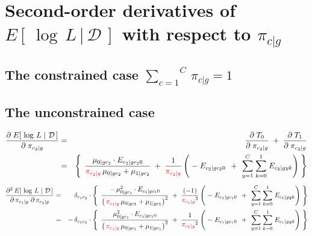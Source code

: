 

\section{Second-order derivatives of $E\!\left[\,\left.\log\,L\,\right\vert\,\mathcal{D}\,\right]$ with respect to $\pi_{c \vert g}$}
\setcounter{theorem}{0}
\setcounter{equation}{0}

\renewcommand{\theenumi}{\roman{enumi}}
\renewcommand{\labelenumi}{\textnormal{(\theenumi)}$\;\;$}

\subsection{The constrained case $\overset{C}{\underset{c=1}{\sum}}\,\pi_{c \vert g} = 1$}


\vskip 0.5cm
\subsection{The unconstrained case}
\begin{eqnarray*}
\dfrac{\partial\;E\!\left[\,\left.\log\,L\;\right\vert\,\mathcal{D}\,\right]}{\partial\;\pi_{c_{2} \vert g}}
&=& \dfrac{\partial\;T_{0}}{\partial\;\pi_{c_{2} \vert g}} \;+\; \dfrac{\partial\;T_{1}}{\partial\;\pi_{c_{2} \vert g}}
\\
&=&
	\left\{\;\,
		\dfrac{\mu_{0 \vert gc_{2}}\cdot E_{c_{2} \vert gc_{2}0}}{{\color{red}\pi_{c_{2} \vert g}}\,\mu_{0 \vert gc_{2}} + \mu_{1\vert gc_{2}}}
		\;+\;
		\dfrac{1}{{\color{red}\pi_{c_{2} \vert g}}}
		\left(
			\;-\;E_{c_{2} \vert gc_{2}0}
			\,\;+\;\,
			\overset{C}{\underset{y=1}{\sum}} \; \overset{1}{\underset{k=0}{\sum}} \; E_{c_{2} \vert gyk}
		\right)
	\;\right\}
\end{eqnarray*}
\begin{eqnarray*}
\dfrac{\partial^{2}\,E\!\left[\,\left.\log\,L\;\right\vert\,\mathcal{D}\,\right]}{\partial\,\pi_{c_{1} \vert g}\;\partial\,\pi_{c_{2} \vert g}}
&=&
	\delta_{c_{1}c_{2}}
	\cdot
	\left\{\;\,
		\dfrac{
			-\,\mu_{0 \vert gc_{1}}^{2}\cdot E_{c_{1} \vert gc_{1}0}
			}{
			\left(\,{\color{red}\pi_{c_{1} \vert g}}\,\mu_{0 \vert gc_{1}} + \mu_{1\vert gc_{1}}\right)^{2}
			}
		\;+\;
		\dfrac{(-1)}{{\color{red}\pi_{c_{1} \vert g}}^{2}}
		\left(
			\;-\;E_{c_{1} \vert gc_{1}0}
			\,\;+\;\,
			\overset{C}{\underset{y=1}{\sum}} \; \overset{1}{\underset{k=0}{\sum}} \; E_{c_{1} \vert gyk}
		\right)
	\;\right\}
\\
&=&
	-\,\delta_{c_{1}c_{2}}
	\cdot
	\left\{\;\,
		\dfrac{
			\mu_{0 \vert gc_{1}}^{2}\cdot E_{c_{1} \vert gc_{1}0}
			}{
			\left(\,{\color{red}\pi_{c_{1} \vert g}}\,\mu_{0 \vert gc_{1}} + \mu_{1\vert gc_{1}}\right)^{2}
			}
		\;+\;
		\dfrac{1}{{\color{red}\pi_{c_{1} \vert g}}^{2}}
		\left(
			\;-\;E_{c_{1} \vert gc_{1}0}
			\,\;+\;\,
			\overset{C}{\underset{y=1}{\sum}} \; \overset{1}{\underset{k=0}{\sum}} \; E_{c_{1} \vert gyk}
		\right)
	\;\right\}
\end{eqnarray*}

